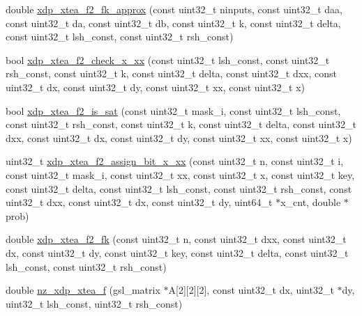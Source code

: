 \begin{DoxyCompactItemize}
\item 
double \hyperlink{xdp-xtea-f-fk_8cc_a69422f7ea09e88db2616953de164360c}{xdp\-\_\-xtea\-\_\-f2\-\_\-fk\-\_\-approx} (const uint32\-\_\-t ninputs, const uint32\-\_\-t daa, const uint32\-\_\-t da, const uint32\-\_\-t db, const uint32\-\_\-t k, const uint32\-\_\-t delta, const uint32\-\_\-t lsh\-\_\-const, const uint32\-\_\-t rsh\-\_\-const)
\item 
bool \hyperlink{xdp-xtea-f-fk_8cc_a64e29f4229587aa126d72879aeddb7f3}{xdp\-\_\-xtea\-\_\-f2\-\_\-check\-\_\-x\-\_\-xx} (const uint32\-\_\-t lsh\-\_\-const, const uint32\-\_\-t rsh\-\_\-const, const uint32\-\_\-t k, const uint32\-\_\-t delta, const uint32\-\_\-t dxx, const uint32\-\_\-t dx, const uint32\-\_\-t dy, const uint32\-\_\-t xx, const uint32\-\_\-t x)
\item 
bool \hyperlink{xdp-xtea-f-fk_8cc_ad18e7e8325085dc5af45386f525ef8dc}{xdp\-\_\-xtea\-\_\-f2\-\_\-is\-\_\-sat} (const uint32\-\_\-t mask\-\_\-i, const uint32\-\_\-t lsh\-\_\-const, const uint32\-\_\-t rsh\-\_\-const, const uint32\-\_\-t k, const uint32\-\_\-t delta, const uint32\-\_\-t dxx, const uint32\-\_\-t dx, const uint32\-\_\-t dy, const uint32\-\_\-t xx, const uint32\-\_\-t x)
\item 
uint32\-\_\-t \hyperlink{xdp-xtea-f-fk_8cc_ae8fb7edb5c3d4ee3057e135328e2f91f}{xdp\-\_\-xtea\-\_\-f2\-\_\-assign\-\_\-bit\-\_\-x\-\_\-xx} (const uint32\-\_\-t n, const uint32\-\_\-t i, const uint32\-\_\-t mask\-\_\-i, const uint32\-\_\-t xx, const uint32\-\_\-t x, const uint32\-\_\-t key, const uint32\-\_\-t delta, const uint32\-\_\-t lsh\-\_\-const, const uint32\-\_\-t rsh\-\_\-const, const uint32\-\_\-t dxx, const uint32\-\_\-t dx, const uint32\-\_\-t dy, uint64\-\_\-t $\ast$x\-\_\-cnt, double $\ast$prob)
\item 
double \hyperlink{xdp-xtea-f-fk_8cc_a07745fc94a36ed4c7d2f803f031456b0}{xdp\-\_\-xtea\-\_\-f2\-\_\-fk} (const uint32\-\_\-t n, const uint32\-\_\-t dxx, const uint32\-\_\-t dx, const uint32\-\_\-t dy, const uint32\-\_\-t key, const uint32\-\_\-t delta, const uint32\-\_\-t lsh\-\_\-const, const uint32\-\_\-t rsh\-\_\-const)
\item 
double \hyperlink{xdp-xtea-f-fk_8cc_abaad14648bcd64a8cfd25e444e73d27a}{nz\-\_\-xdp\-\_\-xtea\-\_\-f} (gsl\-\_\-matrix $\ast$\-A\mbox{[}2\mbox{]}\mbox{[}2\mbox{]}\mbox{[}2\mbox{]}, const uint32\-\_\-t dx, uint32\-\_\-t $\ast$dy, uint32\-\_\-t lsh\-\_\-const, uint32\-\_\-t rsh\-\_\-const)
\end{DoxyCompactItemize}


